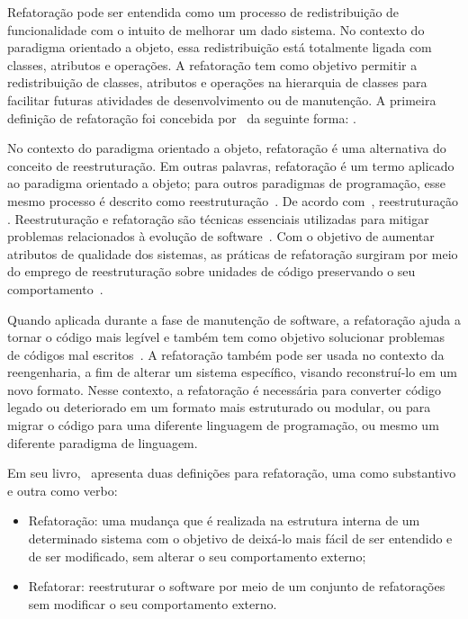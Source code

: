 Refatoração pode ser entendida como um processo de redistribuição de funcionalidade com o intuito de melhorar um dado sistema. No contexto do paradigma orientado a objeto, essa redistribuição está totalmente ligada com classes, atributos e operações. A refatoração tem como objetivo permitir a redistribuição de classes, atributos e operações na hierarquia de classes para facilitar futuras atividades de desenvolvimento ou de manutenção. A primeira definição de refatoração foi concebida por~ da seguinte forma: .

No contexto do paradigma orientado a objeto, refatoração é uma alternativa do conceito de reestruturação. Em outras palavras, refatoração é um termo aplicado ao paradigma orientado a objeto; para outros paradigmas de programação, esse mesmo processo é descrito como reestruturação~\cite{Chikofsky_cross}. De acordo com~, reestruturação . Reestruturação e refatoração são técnicas essenciais utilizadas para mitigar problemas relacionados à evolução de software~\cite{OPDYKE_1992}. Com o objetivo de aumentar atributos de qualidade dos sistemas, as práticas de refatoração surgiram por meio do emprego de reestruturação sobre unidades de código preservando o seu comportamento~\cite{Chikofsky_cross,OPDYKE_1992}.

Quando aplicada durante a fase de manutenção de software, a refatoração ajuda a tornar o código mais legível e também tem como objetivo solucionar problemas de códigos mal escritos~\cite{Chikofsky_cross}. A refatoração também pode ser usada no contexto da reengenharia, a fim de alterar um sistema específico, visando reconstruí-lo em um novo formato. Nesse contexto, a refatoração é necessária para converter código legado ou deteriorado em um formato mais estruturado ou modular, ou para migrar o código para uma diferente linguagem de programação, ou mesmo um diferente paradigma de linguagem.

Em seu livro,~ apresenta duas definições para refatoração, uma como substantivo e outra como verbo:

\begin{itemize}

	\item Refatoração: uma mudança que é realizada na estrutura interna de um determinado sistema com o objetivo de  deixá-lo mais fácil de ser entendido e de ser modificado, sem alterar o seu comportamento externo; 
	\item Refatorar: reestruturar o software por meio de um conjunto de refatorações sem modificar o seu comportamento externo.
\end{itemize}

